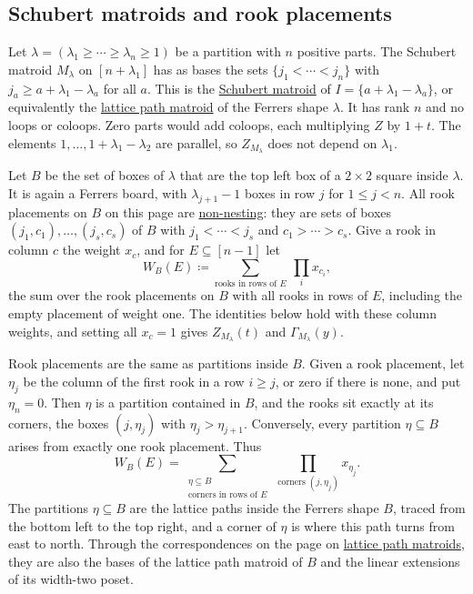 \subsection[schubertMatroidZBoard]{Schubert matroids and rook placements}

Let $\lambda=(\lambda_1\geq\dotsb\geq\lambda_n\geq1)$ be a partition with $n$
positive parts.  The Schubert matroid $M_\lambda$ on $[n+\lambda_1]$ has as
bases the sets $\{j_1<\dotsb<j_n\}$ with $j_a\geq a+\lambda_1-\lambda_a$ for
all $a$.  This is the \hyperref[schubertMatroidDefinition]{Schubert matroid}
of $I=\{a+\lambda_1-\lambda_a\}$, or equivalently the
\hyperref[latticePathMatroids]{lattice path matroid} of the Ferrers shape
$\lambda$.  It has rank $n$ and no loops or coloops.  Zero parts would add
coloops, each multiplying $Z$ by $1+t$.  The elements
$1,\dotsc,1+\lambda_1-\lambda_2$ are parallel, so $Z_{M_\lambda}$ does not
depend on $\lambda_1$.

Let $B$\label{schubertMatroidZBoardOfSquares} be the set of boxes of
$\lambda$ that are the top left box of a $2\times2$ square inside $\lambda$.
It is again a Ferrers board, with $\lambda_{j+1}-1$ boxes in row $j$ for
$1\leq j<n$.  All rook placements on $B$ on this page are
\hyperref[nonNestingRookPlacement]{non-nesting}: they are sets of boxes
$(j_1,c_1),\dotsc,(j_s,c_s)$ of $B$ with $j_1<\dotsb<j_s$ and
$c_1>\dotsb>c_s$.  Give a rook in column $c$ the weight $x_c$, and for
$E\subseteq[n-1]$ let
\[
  W_B(E)\coloneqq\sum_{\text{rooks in rows of } E}\ \prod_{i} x_{c_i},
\]
the sum over the rook placements on $B$ with all rooks in rows of $E$,
including the empty placement of weight one.  The identities below hold with
these column weights, and setting all $x_c=1$ gives $Z_{M_\lambda}(t)$ and
$\Gamma_{M_\lambda}(y)$.

Rook placements are the same as partitions inside $B$.  Given a rook placement, let
$\eta_j$ be the column of the first rook in a row $i\geq j$, or zero if there
is none, and put $\eta_n=0$.  Then $\eta$ is a partition contained in $B$,
and the rooks sit exactly at its corners, the boxes $(j,\eta_j)$ with
$\eta_j>\eta_{j+1}$.  Conversely, every partition $\eta\subseteq B$ arises
from exactly one rook placement.  Thus
\[
  W_B(E)=\sum_{\substack{\eta\subseteq B\\ \text{corners in rows of } E}}
  \ \prod_{\text{corners } (j,\eta_j)} x_{\eta_j}.
\]
The partitions $\eta\subseteq B$ are the lattice paths inside the Ferrers shape
$B$, traced from the bottom left to the top right, and a corner of $\eta$ is
where this path turns from east to north.  Through the
correspondences on the page on \hyperref[latticePathMatroids]{lattice path
matroids}, they are also the bases of the lattice path matroid of $B$ and the
linear extensions of its width-two poset.

